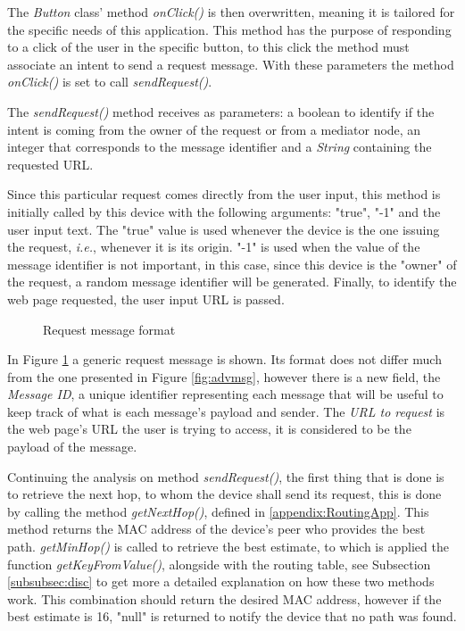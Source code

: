 The \textit{Button} class' method \textit{onClick()} is then overwritten, meaning it is tailored for the specific needs of this application. This method has the purpose of responding to a click of the user in the specific button, to this click the method must associate an intent to send a request message. With these parameters the method \textit{onClick()} is set to call \textit{sendRequest()}.

The \textit{sendRequest()} method receives as parameters: a boolean to identify if the intent is coming from the owner of the request or from a mediator node, an integer that corresponds to the message identifier and a \textit{String} containing the requested \gls{URL}.

Since this particular request comes directly from the user input, this method is initially called by this device with the following arguments: "true", "-1" and the user input text. The "true" value is used whenever the device is the one issuing the request, \textit{i.e.}, whenever it is its origin. "-1" is used when the value of the message identifier is not important, in this case, since this device is the "owner" of the request, a random message identifier will be generated. Finally, to identify the web page requested, the user input \gls{URL} is passed.

\begin{figure}[ht]
   \noindent{}
	\caption{\label{fig:rqtmsg} Request message format}
\end{figure}

In Figure \ref{fig:rqtmsg} a generic request message is shown. Its format does not differ much from the one presented in Figure \ref{fig:advmsg}, however there is a new field, the \textit{Message ID}, a unique identifier representing each message that will be useful to keep track of what is each message's payload and sender. The \textit{\gls{URL} to request} is the web page's \gls{URL} the user is trying to access, it is considered to be the payload of the message.

Continuing the analysis on method \textit{sendRequest()}, the first thing that is done is to retrieve the next hop, to whom the device shall send its request, this is done by calling the method \textit{getNextHop()}, defined in \ref{appendix:RoutingApp}. This method returns the \gls{MAC} address of the device's peer who provides the best path. \textit{getMinHop()} is called to retrieve the best estimate, to which is applied the function \textit{getKeyFromValue()}, alongside with the routing table, see Subsection \ref{subsubsec:disc} to get more a detailed explanation on how these two methods work. This combination should return the desired \gls{MAC} address, however if the best estimate is 16, "null" is returned to notify the device that no path was found.

